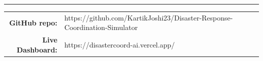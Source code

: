 \documentclass[aspectratio=169,11pt]{beamer}
\begin{document}
\begin{frame}[plain]
  \vspace{0.6em}
  {\color{accent2}\rule{0.9\linewidth}{0.6pt}}
  \vspace{0.4em}

  \footnotesize
  \begin{tabular}{r l}
    {\color{accent}\textbf{GitHub repo:}} &
      {\color{ink}https://github.com/KartikJoshi23/Disaster-Response-Coordination-Simulator}\\[0.25em]
    {\color{accent}\textbf{Live Dashboard:}} &
      {\color{ink}https://disastercoord-ai.vercel.app/}\\
  \end{tabular}
\end{frame}
\end{document}
